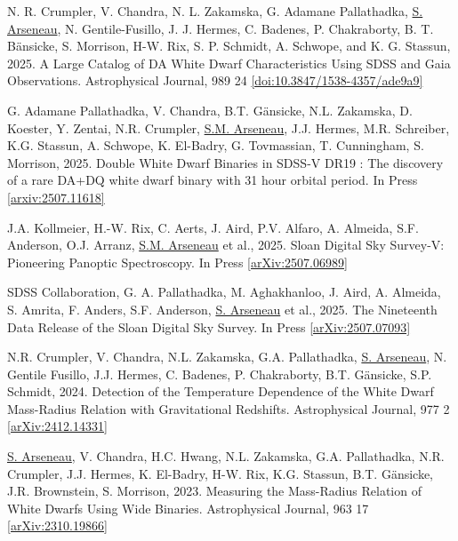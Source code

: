 \documentclass[letterpaper,11pt]{article}
\newenvironment{packed_enumerate}[1][]{
\begin{etaremune}[#1]
  \setlength{\itemsep}{3.7pt}
  \setlength{\parskip}{0pt}
  \setlength{\parsep}{0pt}}{\end{etaremune}
}
\begin{document}
\begin{packed_enumerate}

\item N. R. Crumpler, V. Chandra, N. L. Zakamska, G. Adamane Pallathadka, \underline{S. Arseneau}, N. Gentile-Fusillo, J. J. Hermes, C. Badenes, P. Chakraborty, B. T. B\"ansicke, S. Morrison, H-W. Rix, S. P. Schmidt, A. Schwope, and K. G. Stassun, 2025. A Large Catalog of DA White Dwarf Characteristics Using SDSS and Gaia Observations. Astrophysical Journal, 989 24 \href{https://doi.org/10.3847/1538-4357/ade9a9}{[doi:10.3847/1538-4357/ade9a9]}

\item G. Adamane Pallathadka, V. Chandra, B.T. G\"ansicke, N.L. Zakamska, D. Koester, Y. Zentai, N.R. Crumpler, \underline{S.M. Arseneau}, J.J. Hermes, M.R. Schreiber, K.G. Stassun, A. Schwope, K. El-Badry, G. Tovmassian, T. Cunningham, S. Morrison, 2025. Double White Dwarf Binaries in SDSS-V DR19 : The discovery of a rare DA+DQ white dwarf binary with 31 hour orbital period. In Press \href{https://arxiv.org/abs/2507.11618}{[arxiv:2507.11618]}

\item  J.A. Kollmeier, H.-W. Rix, C. Aerts, J. Aird, P.V. Alfaro, A. Almeida, S.F. Anderson, O.J. Arranz, \underline{S.M. Arseneau} et al., 2025. Sloan Digital Sky Survey-V: Pioneering Panoptic Spectroscopy. In Press \href{https://https://arxiv.org/abs/2507.06989}{[arXiv:2507.06989]} 

\item  SDSS Collaboration, G. A. Pallathadka, M. Aghakhanloo, J. Aird, A. Almeida, S. Amrita, F. Anders, S.F. Anderson, \underline{S. Arseneau} et al., 2025. The Nineteenth Data Release of the Sloan Digital Sky Survey. In Press \href{https://https://arxiv.org/abs/2507.07093}{[arXiv:2507.07093]} 

\item  N.R. Crumpler, V. Chandra, N.L. Zakamska, G.A. Pallathadka, \underline{S. Arseneau}, N. Gentile Fusillo, J.J. Hermes, C. Badenes, P. Chakraborty, B.T. Gänsicke, S.P. Schmidt, 2024. Detection of the Temperature Dependence of the White Dwarf Mass-Radius Relation with Gravitational Redshifts. Astrophysical Journal, 977 2 \href{https://arxiv.org/abs/2412.14331}{[arXiv:2412.14331]} 

\item \underline{S. Arseneau}, V. Chandra, H.C. Hwang, N.L. Zakamska, G.A. Pallathadka, N.R. Crumpler, J.J. Hermes, K. El-Badry, H-W. Rix, K.G. Stassun, B.T. G\"ansicke, J.R. Brownstein, S. Morrison, 2023. Measuring the Mass-Radius Relation of White Dwarfs Using Wide Binaries. Astrophysical Journal, 963 17 \href{https://arxiv.org/abs/2310.19866}{[arXiv:2310.19866]}


\end{packed_enumerate}
\end{document}
